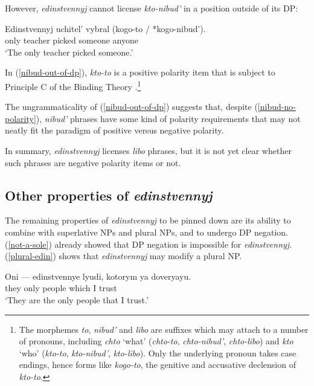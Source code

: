 \documentclass{article}
\begin{document}
However, \textit{edinstvennyj} cannot license \textit{kto-nibud'} in a position outside of its DP:

\begin{exe}
	\ex \label{nibud-out-of-dp} \gll Edinstvennyj uchitel' vybral (kogo-to / *kogo-nibud').\\
	only teacher picked someone {} anyone\\
	\glt `The only teacher picked someone.'
\end{exe}

In (\ref{nibud-out-of-dp}), \textit{kto-to}	is a positive polarity item that is subject to Principle C of the Binding Theory \citep{russneg}.\footnote{The morphemes \textit{to}, \textit{nibud'} and \textit{libo} are suffixes which may attach to a number of pronouns, including \textit{chto} `what' (\textit{chto-to}, \textit{chto-nibud'}, \textit{chto-libo}) and \textit{kto} `who' (\textit{kto-to}, \textit{kto-nibud'}, \textit{kto-libo}). Only the underlying pronoun takes case endings, hence forms like \textit{kogo-to}, the genitive and accusative declension of \textit{kto-to}.}

The ungrammaticality of (\ref{nibud-out-of-dp}) suggests that, despite (\ref{nibud-no-polarity}), \textit{nibud'} phrases have some kind of polarity requirements that may not neatly fit the paradigm of positive versus negative polarity.

In summary, \textit{edinstvennyj} licenses \textit{libo} phrases, but it is not yet clear whether such phrases are negative polarity items or not.

\subsection{Other properties of \textit{edinstvennyj}}
The remaining properties of \textit{edinstvennyj} to be pinned down are its ability to combine with superlative NPs and plural NPs, and to undergo DP negation. (\ref{not-a-sole}) already showed that DP negation is impossible for \textit{edinstvennyj}. (\ref{plural-edin}) shows that \textit{edinstvennyj} may modify a plural NP.

\begin{exe}
	\ex \label{plural-edin} \gll Oni --- edinstvennye lyudi, kotorym ya doveryayu.\\
	they {} only people which I trust\\
	\glt `They are the only people that I trust.'
\end{exe}
\end{document}
